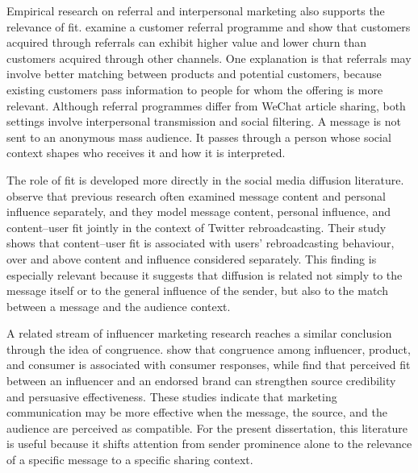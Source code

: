 Empirical research on referral and interpersonal marketing also supports the relevance of fit. \textcite{vandenbulte2018} examine a customer referral programme and show that customers acquired through referrals can exhibit higher value and lower churn than customers acquired through other channels. One explanation is that referrals may involve better matching between products and potential customers, because existing customers pass information to people for whom the offering is more relevant. Although referral programmes differ from WeChat article sharing, both settings involve interpersonal transmission and social filtering. A message is not sent to an anonymous mass audience. It passes through a person whose social context shapes who receives it and how it is interpreted.

The role of fit is developed more directly in the social media diffusion literature. \textcite{zhang2017} observe that previous research often examined message content and personal influence separately, and they model message content, personal influence, and content–user fit jointly in the context of Twitter rebroadcasting. Their study shows that content–user fit is associated with users' rebroadcasting behaviour, over and above content and influence considered separately. This finding is especially relevant because it suggests that diffusion is related not simply to the message itself or to the general influence of the sender, but also to the match between a message and the audience context.

A related stream of influencer marketing research reaches a similar conclusion through the idea of congruence. \textcite{belanche2021} show that congruence among influencer, product, and consumer is associated with consumer responses, while \textcite{breves2019} find that perceived fit between an influencer and an endorsed brand can strengthen source credibility and persuasive effectiveness. These studies indicate that marketing communication may be more effective when the message, the source, and the audience are perceived as compatible. For the present dissertation, this literature is useful because it shifts attention from sender prominence alone to the relevance of a specific message to a specific sharing context.

